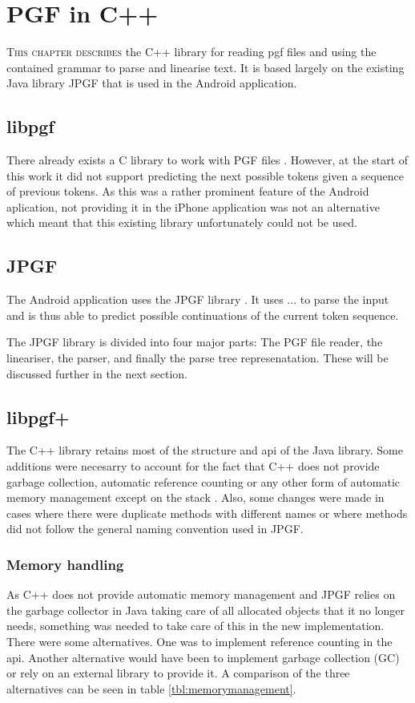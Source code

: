 \chapter{PGF in C++}
\lettrine[lines=4, loversize=-0.1, lraise=0.1]{T}{his chapter describes} the C++ library for reading pgf files and using the contained grammar to parse and linearise text. It is based largely on the existing Java library JPGF that is used in the Android application.


\section{libpgf}
There already exists a C library to work with PGF files \cite{libpgf}. However, at the start of this work it did not support predicting the next possible tokens given a sequence of previous tokens. As this was a rather prominent feature of the Android aplication, not providing it in the iPhone application was not an alternative which meant that this existing library unfortunately could not be used.


\section{JPGF}
The Android application uses the JPGF library \cite{jpgf}. It uses ... to parse the input and is thus able to predict possible continuations of the current token sequence.

The JPGF library is divided into four major parts: The PGF file reader, the lineariser, the parser, and finally the parse tree represenatation. These will be discussed further in the next section.


\section{libpgf+}
The C++ library retains most of the structure and api of the Java library. Some additions were necesarry to account for the fact that C++ does not provide garbage collection, automatic reference counting or any other form of automatic memory management except on the stack \cite{cxx11}. Also, some changes were made in cases where there were duplicate methods with different names or where methods did not follow the general naming convention used in JPGF.


\subsection{Memory handling}
As C++ does not provide automatic memory management and JPGF relies on the garbage collector in Java taking care of all allocated objects that it no longer needs, something was needed to take care of this in the new implementation. There were some alternatives. One was to implement reference counting in the api. Another alternative would have been to implement garbage collection (GC) \cite{gc} or rely on an external library to provide it. A comparison of the three alternatives can be seen in table \ref{tbl:memorymanagement}.


